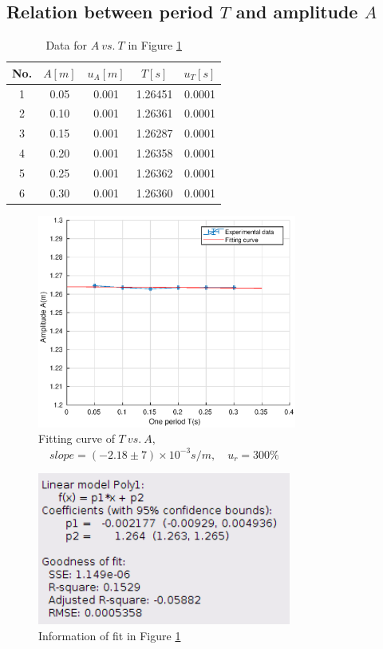 \subsection{Relation between period $T$ and amplitude $A$}
    \begin{table}[h] \small
        \centering
        \begin{tabular}{|c|c|c|c|c|}
            \hline
            No. & $A[m]$ & $u_{A}[m]$ & $T[s]$ & $u_{T}[s]$\\ \hline
            1 & 0.05 & 0.001 & 1.26451 & 0.0001\\ \hline
            2 & 0.10 & 0.001 & 1.26361 & 0.0001\\ \hline
            3 & 0.15 & 0.001 & 1.26287 & 0.0001\\ \hline
            4 & 0.20 & 0.001 & 1.26358 & 0.0001\\ \hline
            5 & 0.25 & 0.001 & 1.26362 & 0.0001\\ \hline
            6 & 0.30 & 0.001 & 1.26360 & 0.0001\\ \hline
        \end{tabular}
        \caption{Data for $A\ vs.\ T$ in Figure \ref{at}}\label{atdata}
    \end{table}
    \begin{figure}[!h]
        \centering
        \includegraphics[height=7cm]{images/at.eps}
        \caption{Fitting curve of $T\ vs.\ A$, $\quad slope=(-2.18\pm7)\times10^{-3}s/m, \quad u_r=300\%$}\label{at}
    \end{figure}
    \vspace{0.6cm}
    \begin{figure}[h]
        \centering
        \includegraphics[height=5cm]{images/atinfo.png}
        \caption{Information of fit in Figure \ref{at}}\label{atinfo}
    \end{figure}
